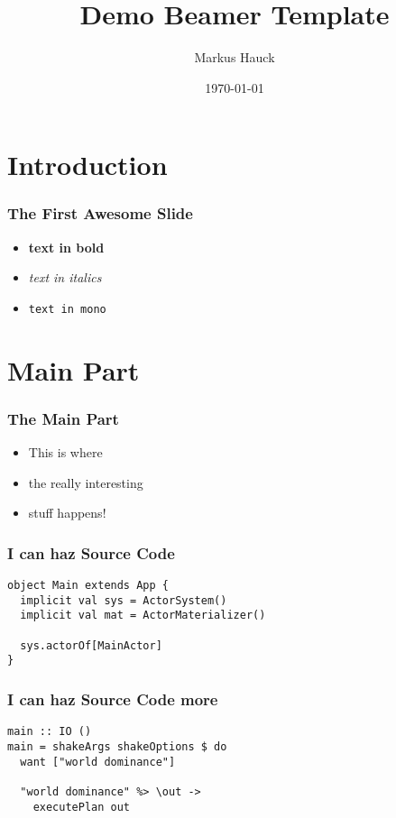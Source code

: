 \documentclass{beamer}
\title{Demo Beamer Template}
\author{Markus Hauck}
\date{\today}
\begin{document}
 
\frame{\titlepage}

\section{Introduction}
\label{sec:introduction}
 
\begin{frame}
\frametitle{The First Awesome Slide}
\begin{itemize}
\item \textbf{text in bold}
\item \textit{text in italics}
\item \texttt{text in mono}
\end{itemize}
\end{frame}

\section{Main Part}
\label{sec:main-part}
\begin{frame}
  \frametitle{The Main Part}
  \begin{itemize}
  \item This is where
  \item the really interesting
  \item stuff happens!
  \end{itemize}
\end{frame}

\begin{frame}[fragile]
  \frametitle{I can haz Source Code}
  \begin{center}
\begin{verbatim}
object Main extends App {
  implicit val sys = ActorSystem()
  implicit val mat = ActorMaterializer()
  
  sys.actorOf[MainActor]
}
\end{verbatim}
  \end{center}
\end{frame}

\begin{frame}[fragile]
  \frametitle{I can haz Source Code more}
  \begin{center}
\begin{verbatim}
main :: IO ()
main = shakeArgs shakeOptions $ do
  want ["world dominance"]

  "world dominance" %> \out ->
    executePlan out
\end{verbatim}
  \end{center}
\end{frame}
\end{document}
